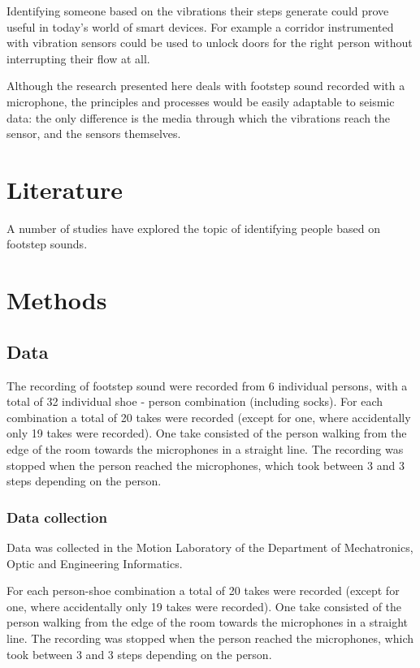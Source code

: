\documentclass{article}
\begin{document}
Identifying someone based on the vibrations their steps generate could prove useful in today's world of smart devices. For example a corridor instrumented with vibration sensors could be used to unlock doors for the right person without interrupting their flow at all.

Although the research presented here deals with footstep sound recorded with a microphone, the principles and processes would be easily adaptable to seismic data: the only difference is the media through which the vibrations reach the sensor, and the sensors themselves.

\section{Literature}

A number of studies have explored the topic of identifying people based on footstep sounds.

\section{Methods}
\subsection{Data}

The recording of footstep sound were recorded from 6 individual persons, with a total of 32 individual shoe - person combination (including socks). For each combination a total of 20 takes were recorded (except for one, where accidentally only 19 takes were recorded). One take consisted of the person walking from the edge of the room towards the microphones in a straight line. The recording was stopped when the person reached the microphones, which took between 3 and 3 steps depending on the person.

\subsubsection{Data collection}
Data was collected in the Motion Laboratory of the Department of Mechatronics, Optic and Engineering Informatics. 

For each person-shoe combination a total of 20 takes were recorded (except for one, where accidentally only 19 takes were recorded). One take consisted of the person walking from the edge of the room towards the microphones in a straight line. The recording was stopped when the person reached the microphones, which took between 3 and 3 steps depending on the person.
\end{document}
